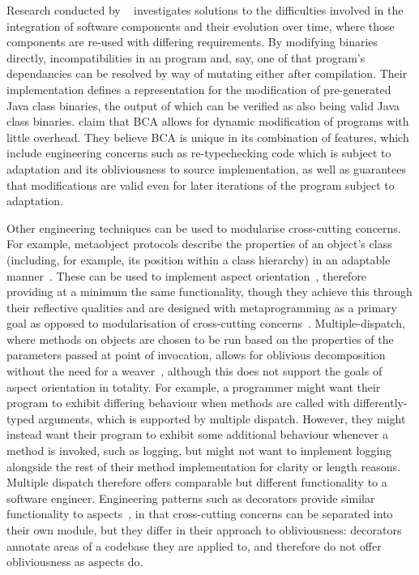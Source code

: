 Research conducted by ~\cite{keller1998binary}
investigates solutions to the difficulties involved in the integration of
software components and their evolution over time, where those components are
re-used with differing requirements. By modifying binaries directly,
incompatibilities in an program and, say, one of that program's dependancies can
be resolved by way of mutating either after compilation. Their implementation
defines a representation for the modification of pre-generated Java class
binaries, the output of which can be verified as also being valid Java class
binaries.  claim that BCA allows for dynamic
modification of programs with little overhead. They believe BCA is unique in its
combination of features, which include engineering concerns such as
re-typechecking code which is subject to adaptation and its obliviousness to
source implementation, as well as guarantees that modifications are valid even
for later iterations of the program subject to adaptation.

Other engineering techniques can be used to modularise cross-cutting concerns.
For example, metaobject protocols describe the properties of an object's class
(including, for example, its position within a class hierarchy) in an adaptable
manner~\cite{kiczales1991art}. These can be used to implement aspect
orientation~\cite{espakaspect}, therefore providing at a minimum the same
functionality, though they achieve this through their reflective qualities and
are designed with metaprogramming as a primary goal as opposed to modularisation
of cross-cutting concerns~\cite{kiczales1991art,sullivan2001aspect}.
Multiple-dispatch, where methods on objects are chosen to be run based on the
properties of the parameters passed at point of invocation, allows for oblivious
decomposition without the need for a weaver~\cite{dozsa2008lisp}, although this
does not support the goals of aspect orientation in totality. For example, a
programmer might want their program to exhibit differing behaviour when methods
are called with differently-typed arguments, which is supported by multiple
dispatch. However, they might instead want their program to exhibit some
additional behaviour whenever a method is invoked, such as logging, but might
not want to implement logging alongside the rest of their method implementation
for clarity or length reasons. Multiple dispatch therefore offers comparable but
different functionality to a software engineer. Engineering patterns such as
decorators provide similar functionality to
aspects~\cite{friesel2017annotations}, in that cross-cutting concerns can be
separated into their own module, but they differ in their approach to
obliviousness: decorators annotate areas of a codebase they are applied to, and
therefore do not offer obliviousness as aspects do. 

